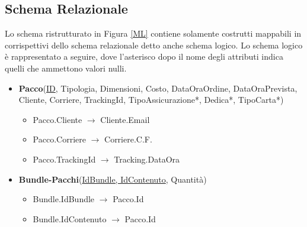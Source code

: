 \subsection{Schema Relazionale}
Lo schema ristrutturato in Figura \ref{ML} contiene solamente costrutti mappabili in corrispettivi dello schema relazionale detto anche schema logico. Lo schema logico è rappresentato a seguire, dove l'asterisco dopo il nome degli attributi indica quelli che ammettono valori nulli.
\begin{itemize}
    \setlength{\itemindent}{+0in}
    \item \textbf{Pacco}(\underline{ID}, Tipologia, Dimensioni, Costo, DataOraOrdine, DataOraPrevista, Cliente, Corriere, TrackingId, TipoAssicurazione*, Dedica*, TipoCarta*)
        \begin{itemize}
            \setlength{\itemindent}{+.2in}
            \item Pacco.Cliente $\rightarrow$ Cliente.Email 
            \item Pacco.Corriere $\rightarrow$ Corriere.C.F.
            \item Pacco.TrackingId $\rightarrow$ Tracking.DataOra
        \end{itemize}
    \item \textbf{Bundle-Pacchi}(\underline{IdBundle, IdContenuto}, Quantità)
        \begin{itemize}
            \setlength{\itemindent}{+.2in}
            \item Bundle.IdBundle $\rightarrow$ Pacco.Id 
            \item Bundle.IdContenuto $\rightarrow$ Pacco.Id
        \end{itemize}
        

\end{itemize}
